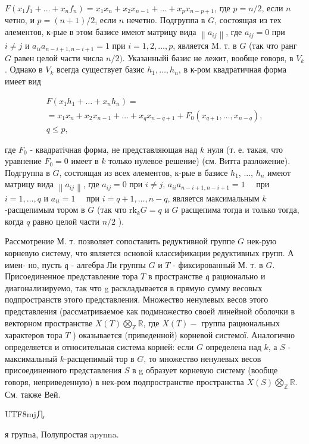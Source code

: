 \documentclass[10pt]{article}
\begin{document}
$F\left(x_{1} f_{1}+\ldots+x_{n} f_{n}\right)=x_{1} x_{n}+x_{2} x_{n-1}+\ldots+x_{p} x_{n-p+1}$, где $p=n / 2$, если $n$ четно, и $p=(n+1) / 2$, если $n$ нечетно. Подгруппа в $G$, состоящая из тех әлементов, к-рые в этом базисе имеют матрицу вида $\left\|a_{i j}\right\|$, где $a_{i j}=0$ при $i \neq j$ и $a_{i i} a_{n-i+1, n-i+1}=1$ при $i=1,2, \ldots, p$, является M. т. в $G$ (так что ранг $G$ равен целой части числа $n / 2)$. Указанныйі базис не лежит, вообще говоря, в $V_{k}$. Однако в $V_{k}$ всегда существует базис $h_{1}, \ldots, h_{n}$, в к-ром квадратичная форма имеет вид



\[

\begin{gathered}

F\left(x_{1} h_{1}+\ldots+x_{n} h_{n}\right)= \\

=x_{1} x_{n}+x_{2} x_{n-1}+\ldots+x_{q} x_{n-q+1}+F_{0}\left(x_{q+1}, \ldots, x_{n-q}\right), \\

q \leqslant p,

\end{gathered}

\]



где $F_{0}$ - квадратічная форма, не представляющая над $k$ нуля (т. е. такая, что уравнение $F_{0}=0$ имеет в $k$ только нулевое решение) (см. Витта разложение). Подгруппа в $G$, состоящая из всех әлементов, к-рые в базисе $h_{1}$, ..., $h_{n}$ имеют матрицу вида $\left\|a_{i j}\right\|$, где $a_{i j}=0$ при $i \neq j$, $a_{i i} a_{n-i+1, n-i+1}=1 \quad$ при $i=1, \ldots, q$ и $a_{i i}=1 \quad$ при $i=q+1, \ldots, n-q$, является максимальным $k$-расщепимым тором в $G$ (так что $\mathrm{rk}_{k} G=q$ и $G$ расщепима тогда и только тогда, когда $q$ равно целой части $n / 2$ ).



Рассмотрение М. т. позволяет сопоставить редуктивной группе $G$ нек-рую корневую систему, что является основой классификации редуктивных групп. А имен- но, пусть $\mathfrak{q}$ - алгебра Ли группы $G$ и $T$ - фиксированный М. т. в $G$. Присоединенное представление тора $T$ в пространстве $\mathfrak{q}$ рационально и диагонализируемо, так что g раскладывается в прямую сумму весовых подпространств этого представления. Множество ненулевых весов этого представления (рассматриваемое как подмножество своей линейной оболочки в векторном пространстве $X(T) \bigotimes_{\mathbb{Z}} \mathbb{R}$, где $X(T)-$ группа рациональных характеров тора $T$ ) оказывается (приведенной) корневой системої. Аналогично определяется и относительная система корней: если $G$ определена над $k$, а $S$ - максимальный $k$-расщепимый тор в $G$, то множество ненулевых весов присоединенного представления $S$ в g образует корневую систему (вообще говоря, неприведенную) в нек-ром подпространстве пространства $X(S) \bigotimes_{\mathbb{Z}} \mathbb{R}$. См. также Вей.\begin{CJK}{UTF8}{mj}几\end{CJK}я групnа, Полупростая apynna.
\end{document}
